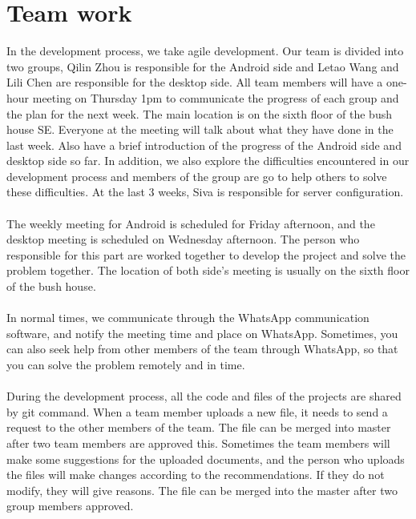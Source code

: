 \documentclass{article}
\begin{document}
\maketitle

\section{Team work}

In the development process, we take agile development. Our team is divided into two groups, Qilin Zhou is responsible for the Android side and Letao Wang and Lili Chen are responsible for the desktop side. All team members will have a one-hour meeting on Thursday 1pm to communicate the progress of each group and the plan for the next week. The main location is on the sixth floor of the bush house SE. Everyone at the meeting will talk about what they have done in the last week. Also have a brief introduction of the progress of the Android side and desktop side so far. In addition, we also explore the difficulties encountered in our development process and members of the group are go to help others to solve these difficulties. At the last 3 weeks, Siva is responsible for server configuration.\\\\

The weekly meeting for Android is scheduled for Friday afternoon, and the desktop meeting is scheduled on Wednesday afternoon. The person who responsible for this part are worked together to develop the project and solve the problem together. The location of both side’s meeting is usually on the sixth floor of the bush house.\\\\

In normal times, we communicate through the WhatsApp communication software, and notify the meeting time and place on WhatsApp. Sometimes, you can also seek help from other members of the team through WhatsApp, so that you can solve the problem remotely and in time.\\\\

During the development process, all the code and files of the projects are shared by git command. When a team member uploads a new file, it needs to send a request to the other members of the team. The file can be merged into master after two team members are approved this. Sometimes the team members will make some suggestions for the uploaded documents, and the person who uploads the files will make changes according to the recommendations. If they do not modify, they will give reasons. The file can be merged into the master after two group members approved.\\\\
\end{document}
